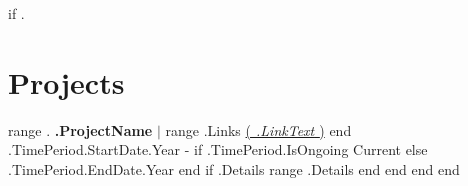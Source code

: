 {{if .}}
    \section{Projects}
    \vspace{-5pt}
    \resumeSubHeadingListStart
    {{range .}}
        \resumeProjectHeading
            { \textbf{ {{.ProjectName}} } $|$ {{range .Links}} \href{ {{.LinkURL}} }{(\emph{\underline{ {{.LinkText}} }})}} {{end}} { {{.TimePeriod.StartDate.Year}} - {{if .TimePeriod.IsOngoing}} Current {{else}} {{.TimePeriod.EndDate.Year}} {{end}} }
            {{if .Details}}
            \resumeItemListStart
                {{range .Details}}
                {{end}}
            \resumeItemListEnd
            {{end}}
    {{end}}
    \resumeSubHeadingListEnd
    \vspace{-16pt}
{{end}}
